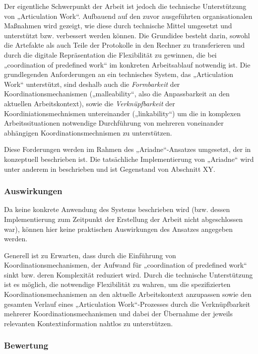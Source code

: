 Der eigentliche Schwerpunkt der Arbeit ist jedoch die technische Unterstützung von „Articulation Work“. Aufbauend auf den zuvor ausgeführten organisationalen Maßnahmen wird gezeigt, wie diese durch technische Mittel umgesetzt und unterstützt bzw. verbessert werden können. Die Grundidee besteht darin, sowohl die Artefakte als auch Teile der Protokolle in den Rechner zu transferieren und durch die digitale Repräsentation die Flexibilität zu gewinnen, die bei „coordination of predefined work“ im konkreten Arbeitsablauf notwendig ist. Die grundlegenden Anforderungen an ein technisches System, das „Articulation Work“ unterstützt, sind deshalb auch die \emph{Formbarkeit} der Koordinationsmechanismen („malleability“, also die Anpassbarkeit an den aktuellen Arbeitskontext), sowie die \emph{Verknüpfbarkeit} der Koordiniationsmechnismen untereinander („linkability“) um die in komplexen Arbeitssituationen notwendige Durchführung von mehreren voneinander abhängigen Koordinationsmechnismen zu unterstützen.

Diese Forderungen werden im Rahmen des „Ariadne“-Ansatzes umgesetzt, der in \citep{Schmidt96} konzeptuell beschrieben ist. Die tatsächliche Implementierung von „Ariadne“ wird unter anderem in \citep{Sarini03} beschrieben und ist Gegenstand von Abschnitt XY.

\subsubsection{Auswirkungen}

Da keine konkrete Anwendung des Systems beschrieben wird (bzw. dessen Implementierung zum Zeitpunkt der Erstellung der Arbeit nicht abgeschlossen war), können hier keine praktischen Auswirkungen des Ansatzes angegeben werden.

Generell ist zu Erwarten, dass durch die Einführung von Koordinationsmechanismen, der Aufwand für „coordination of predefined work“ sinkt bzw. deren Komplexität reduziert wird. Durch die technische Unterstützung ist es möglich, die notwendige Flexibilität zu wahren, um die spezifizierten Koordinationsmechanismen an den aktuelle Arbeitskontext anzupassen sowie den gesamten Verlauf eines „Articulation Work“-Prozesses durch die Verknüpfbarkeit mehrerer Koordinationsmechanismen und dabei der Übernahme der jeweils relevanten Kontextinformation nahtlos zu unterstützen.

\subsubsection{Bewertung}

